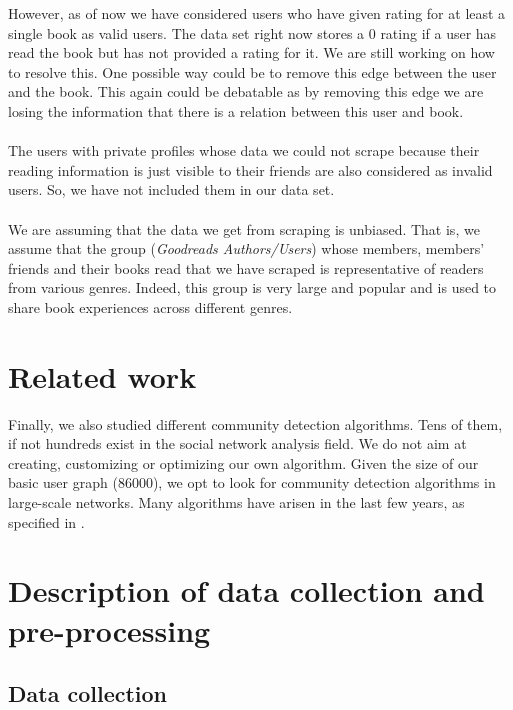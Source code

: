 \documentclass[11pt]{article}
\begin{document}
However, as of now we have considered users who have given rating for at least a single book as valid users. The data set right now stores a 0 rating if a user has read the book but has not provided a rating for it. We are still working on how to resolve this. One possible way could be to remove this edge between the user and the book. This again could be debatable as by removing this edge we are losing the information that there is a relation between this user and book.\\\\
The users with private profiles whose data we could not scrape because their reading information is just visible to their friends are also considered as invalid users. So, we have not included them in our data set.\\\\
We are assuming that the data we get from scraping is unbiased. That is, we assume that the group ({\it Goodreads Authors/Users}) whose members, members' friends and their books read that we have scraped is representative of readers from various genres. Indeed, this group is very large and popular and is used to share book experiences across different genres.

\section{Related work}


Finally, we also studied different community detection algorithms. Tens of them, if not hundreds exist in the social network analysis field. We do not aim at creating, customizing or optimizing our own algorithm. Given the size of our basic user graph ($86000$), we opt to look for community detection algorithms in large-scale networks.
Many algorithms have arisen in the last few years, as specified in \cite{survey}.




\section{Description of data collection and pre-processing}
\label{sec:data_acquisition}

\subsection{Data collection}
\label{sec:data_colection}
\end{document}
